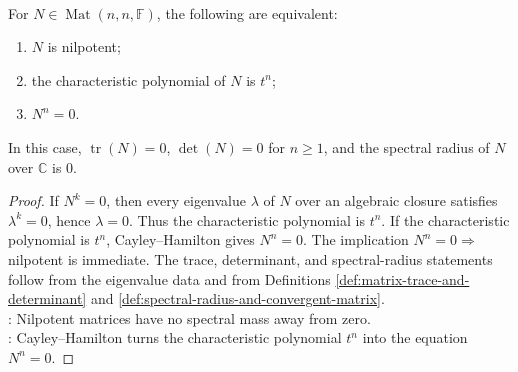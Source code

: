 \begin{proposition} \label{prop:nilpotent-matrix-basic-invariants} \\
For $N\in\operatorname{Mat}(n,n,\mathbb{F})$, the following are equivalent:
\begin{enumerate}[label=(\roman*)]
\setlength{\itemsep}{0pt}
\item $N$ is nilpotent;
\item the characteristic polynomial of $N$ is $t^n$;
\item $N^n=0$.
\end{enumerate}
In this case, $\operatorname{tr}(N)=0$, $\det(N)=0$ for $n\geq1$, and the spectral radius of $N$ over $\mathbb{C}$ is $0$.
\begin{proof}
If $N^k=0$, then every eigenvalue $\lambda$ of $N$ over an algebraic closure satisfies $\lambda^k=0$, hence $\lambda=0$. Thus the characteristic polynomial is $t^n$. If the characteristic polynomial is $t^n$, Cayley--Hamilton gives $N^n=0$. The implication $N^n=0\Rightarrow$ nilpotent is immediate. The trace, determinant, and spectral-radius statements follow from the eigenvalue data and from Definitions \ref{def:matrix-trace-and-determinant} and \ref{def:spectral-radius-and-convergent-matrix}.\\
: Nilpotent matrices have no spectral mass away from zero.\\
: Cayley--Hamilton turns the characteristic polynomial $t^n$ into the equation $N^n=0$.
\end{proof}
\end{proposition}

